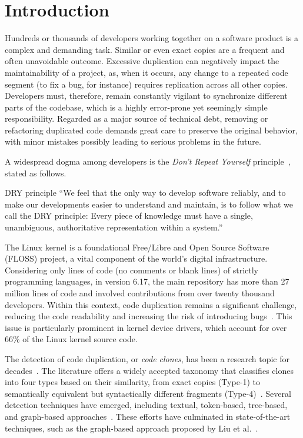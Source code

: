 \documentclass[10pt,conference]{IEEEtran}
\newenvironment{dry-highlight-box}[1]{%
  \begin{tcolorbox}[colback=blue!5!white, colframe=blue!60!black, boxrule=0.5pt,
                    left=1mm, right=1mm, top=1mm, bottom=1mm, sharp corners]
    \textbf{[#1]} \itshape}{\end{tcolorbox}}
\begin{document}

\IEEEpeerreviewmaketitle

\section{Introduction}
\label{sec:introduction}

Hundreds or thousands of developers working together on a software product is a complex and demanding task. Similar or even exact copies are a frequent and often unavoidable outcome. Excessive duplication can negatively impact the maintainability of a project, as, when it occurs, any change to a repeated code segment (to fix a bug, for instance) requires replication across all other copies. Developers must, therefore, remain constantly vigilant to synchronize different parts of the codebase, which is a highly error-prone yet seemingly simple responsibility. Regarded as a major source of technical debt, removing or refactoring duplicated code demands great care to preserve the original behavior, with minor mistakes possibly leading to serious problems in the future.

A widespread dogma among developers is the \textit{Don't Repeat Yourself} principle~\cite{pragmatic-programmer}, stated as follows.

\begin{dry-highlight-box}{DRY principle}
  ``We feel that the only way to develop software reliably, and to make our
  developments easier to understand and maintain, is to follow what we call the
  DRY principle: Every piece of knowledge must have a single, unambiguous,
  authoritative representation within a system.''
\end{dry-highlight-box}

The Linux kernel is a foundational Free/Libre and Open Source Software (FLOSS) project, a vital component of the world's digital infrastructure. Considering only lines of code (no comments or blank lines) of strictly programming languages, in version 6.17, the main repository has more than 27 million lines of code and involved contributions from over twenty thousand developers. Within this context, code duplication remains a significant challenge,  reducing the code readability and increasing the risk of introducing bugs~\cite{harmone,harmtwo}. This issue is particularly prominent in kernel device drivers, which account for over 66\% of the Linux kernel source code.

The detection of code duplication, or \textit{code clones}, has been a research topic for decades~\cite{firstman}. The literature offers a widely accepted taxonomy that classifies clones into four types based on their similarity, from exact copies (Type-1) to semantically equivalent but syntactically different fragments (Type-4)~\cite{litreview}. Several detection techniques have emerged, including textual, token-based, tree-based, and graph-based approaches~\cite{litreview}. These efforts have culminated in state-of-the-art techniques, such as the graph-based approach proposed by Liu et al.~\cite{tailor}.
\end{document}
